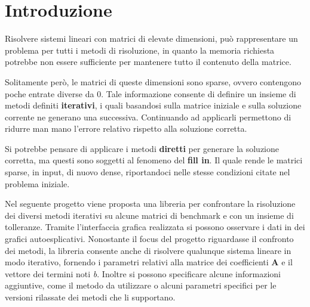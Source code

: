 \section{Introduzione}

Risolvere sistemi lineari con matrici di elevate dimensioni, può rappresentare un problema per tutti i metodi di risoluzione, in quanto la memoria richiesta potrebbe non essere sufficiente per mantenere tutto il contenuto della matrice.

 Solitamente però, le matrici di queste dimensioni sono sparse, ovvero contengono poche entrate diverse da 0. Tale informazione consente di definire un insieme di metodi definiti \textbf{iterativi}, i quali basandosi sulla matrice iniziale e sulla soluzione corrente ne generano una successiva. Continuando ad applicarli permettono di ridurre man mano l'errore relativo rispetto alla soluzione corretta.
 
 Si potrebbe pensare di applicare i metodi \textbf{diretti} per generare la soluzione corretta, ma questi sono soggetti al fenomeno del \textbf{fill in}. Il quale rende le matrici sparse, in input, di nuovo dense, riportandoci nelle stesse condizioni citate nel problema iniziale.
 
 Nel seguente progetto viene proposta una libreria per confrontare la risoluzione dei diversi metodi iterativi su alcune matrici di benchmark e con un insieme di tolleranze. Tramite l'interfaccia grafica realizzata si possono osservare i dati in dei grafici autoesplicativi. Nonostante il focus del progetto riguardasse il confronto dei metodi, la libreria consente anche di risolvere qualunque sistema lineare in modo iterativo, fornendo i parametri relativi alla matrice dei coefficienti \textbf{A} e il vettore dei termini noti \textit{b}. Inoltre si possono specificare alcune informazioni aggiuntive, come il metodo da utilizzare o alcuni parametri specifici per le versioni rilassate dei metodi che li supportano.
 
 
 